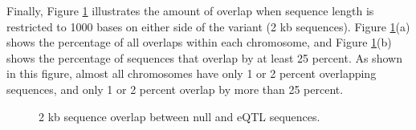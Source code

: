 \documentclass[12pt, onecolumn, oneside]{gsajnl}
\begin{document}
Finally, Figure \ref{2kbOverlaps} illustrates the amount of overlap when sequence length is restricted to 1000 bases on either side of the variant (2 kb sequences). Figure \ref{2kbOverlaps}(a) shows the percentage of all overlaps within each chromosome, and Figure \ref{2kbOverlaps}(b) shows the percentage of sequences that overlap by at least 25 percent. As shown in this figure, almost all chromosomes have only 1 or 2 percent overlapping sequences, and only 1 or 2 percent overlap by more than 25 percent.

\begin{figure}[!htbp]%
\centering
{}%
\qquad
{}%
\caption{2 kb sequence overlap between null and eQTL sequences.}\label{2kbOverlaps}%
\end{figure}  
\end{document}
